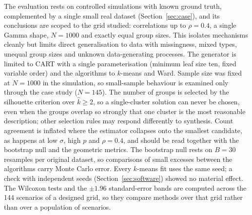 \documentclass[pdflatex,referee]{sn-jnl}
\begin{document}
The evaluation rests on controlled simulations with known ground truth,
complemented by a single small real dataset (Section~\ref{sec:case}), and its
conclusions are scoped to the grid studied: correlations up
to $\rho = 0.4$, a single Gamma shape, $N = 1000$ and exactly equal group
sizes. This isolates mechanisms cleanly but limits direct generalisation to
data with missingness, mixed types, unequal group sizes and unknown
data-generating processes. The generator is limited to CART with a single
parameterisation (minimum leaf size ten, fixed variable order) and the
algorithms to $k$-means and Ward. Sample size was fixed at $N = 1000$ in the
simulation, so small-sample behaviour is examined only through the case study
($N = 145$). The number of groups is selected by the
silhouette criterion over $\hat{k} \ge 2$, so a single-cluster solution can
never be chosen, even when the groups overlap so strongly that one cluster is
the most reasonable description; other selection rules \citep{milligan1985}
may respond differently to synthesis. Count agreement is inflated where the
estimator collapses onto the smallest candidate, as happens at low $\sigma$,
high $p$ and $\rho = 0.4$, and should be read together with the bootstrap null
and the geometric metrics. The bootstrap null rests on $B = 30$ resamples per
original dataset, so comparisons of small excesses between the algorithms
carry Monte Carlo error. Every $k$-means fit uses the same seed; a check with
independent seeds (Section~\ref{sec:software}) showed no material effect. The Wilcoxon tests
and the $\pm 1.96$ standard-error bands are computed across the 144 scenarios
of a designed grid, so they compare methods over that grid rather than over a
population of scenarios.
\end{document}
